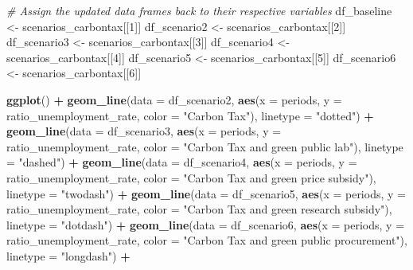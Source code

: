 \documentclass[
]{article}
\newenvironment{Shaded}{\begin{snugshade}}{\end{snugshade}}
\newcommand{\AttributeTok}[1]{\textcolor[rgb]{0.13,0.29,0.53}{#1}}
\newcommand{\CommentTok}[1]{\textcolor[rgb]{0.56,0.35,0.01}{\textit{#1}}}
\newcommand{\DecValTok}[1]{\textcolor[rgb]{0.00,0.00,0.81}{#1}}
\newcommand{\FunctionTok}[1]{\textcolor[rgb]{0.13,0.29,0.53}{\textbf{#1}}}
\newcommand{\NormalTok}[1]{#1}
\newcommand{\OtherTok}[1]{\textcolor[rgb]{0.56,0.35,0.01}{#1}}
\newcommand{\SpecialCharTok}[1]{\textcolor[rgb]{0.81,0.36,0.00}{\textbf{#1}}}
\newcommand{\StringTok}[1]{\textcolor[rgb]{0.31,0.60,0.02}{#1}}
\begin{document}
\begin{Shaded}
\begin{Highlighting}[]
\CommentTok{\# Assign the updated data frames back to their respective variables}
\NormalTok{df\_baseline }\OtherTok{\textless{}{-}}\NormalTok{ scenarios\_carbontax[[}\DecValTok{1}\NormalTok{]]}
\NormalTok{df\_scenario2 }\OtherTok{\textless{}{-}}\NormalTok{ scenarios\_carbontax[[}\DecValTok{2}\NormalTok{]]}
\NormalTok{df\_scenario3 }\OtherTok{\textless{}{-}}\NormalTok{ scenarios\_carbontax[[}\DecValTok{3}\NormalTok{]]}
\NormalTok{df\_scenario4 }\OtherTok{\textless{}{-}}\NormalTok{ scenarios\_carbontax[[}\DecValTok{4}\NormalTok{]]}
\NormalTok{df\_scenario5 }\OtherTok{\textless{}{-}}\NormalTok{ scenarios\_carbontax[[}\DecValTok{5}\NormalTok{]]}
\NormalTok{df\_scenario6 }\OtherTok{\textless{}{-}}\NormalTok{ scenarios\_carbontax[[}\DecValTok{6}\NormalTok{]]}


\FunctionTok{ggplot}\NormalTok{() }\SpecialCharTok{+}
  \FunctionTok{geom\_line}\NormalTok{(}\AttributeTok{data =}\NormalTok{ df\_scenario2, }\FunctionTok{aes}\NormalTok{(}\AttributeTok{x =}\NormalTok{ periods, }\AttributeTok{y =}\NormalTok{ ratio\_unemployment\_rate, }\AttributeTok{color =} \StringTok{"Carbon Tax"}\NormalTok{), }\AttributeTok{linetype =} \StringTok{"dotted"}\NormalTok{) }\SpecialCharTok{+}
  \FunctionTok{geom\_line}\NormalTok{(}\AttributeTok{data =}\NormalTok{ df\_scenario3, }\FunctionTok{aes}\NormalTok{(}\AttributeTok{x =}\NormalTok{ periods, }\AttributeTok{y =}\NormalTok{ ratio\_unemployment\_rate, }\AttributeTok{color =} \StringTok{"Carbon Tax and green public lab"}\NormalTok{), }\AttributeTok{linetype =} \StringTok{"dashed"}\NormalTok{) }\SpecialCharTok{+}
  \FunctionTok{geom\_line}\NormalTok{(}\AttributeTok{data =}\NormalTok{ df\_scenario4, }\FunctionTok{aes}\NormalTok{(}\AttributeTok{x =}\NormalTok{ periods, }\AttributeTok{y =}\NormalTok{ ratio\_unemployment\_rate, }\AttributeTok{color =} \StringTok{"Carbon Tax and green price subsidy"}\NormalTok{), }\AttributeTok{linetype =} \StringTok{"twodash"}\NormalTok{) }\SpecialCharTok{+}
  \FunctionTok{geom\_line}\NormalTok{(}\AttributeTok{data =}\NormalTok{ df\_scenario5, }\FunctionTok{aes}\NormalTok{(}\AttributeTok{x =}\NormalTok{ periods, }\AttributeTok{y =}\NormalTok{ ratio\_unemployment\_rate, }\AttributeTok{color =} \StringTok{"Carbon Tax and green research subsidy"}\NormalTok{), }\AttributeTok{linetype =} \StringTok{"dotdash"}\NormalTok{) }\SpecialCharTok{+}
  \FunctionTok{geom\_line}\NormalTok{(}\AttributeTok{data =}\NormalTok{ df\_scenario6, }\FunctionTok{aes}\NormalTok{(}\AttributeTok{x =}\NormalTok{ periods, }\AttributeTok{y =}\NormalTok{ ratio\_unemployment\_rate, }\AttributeTok{color =} \StringTok{"Carbon Tax and green public procurement"}\NormalTok{), }\AttributeTok{linetype =} \StringTok{"longdash"}\NormalTok{) }\SpecialCharTok{+}

\end{Highlighting}
\end{Shaded}
\end{document}

